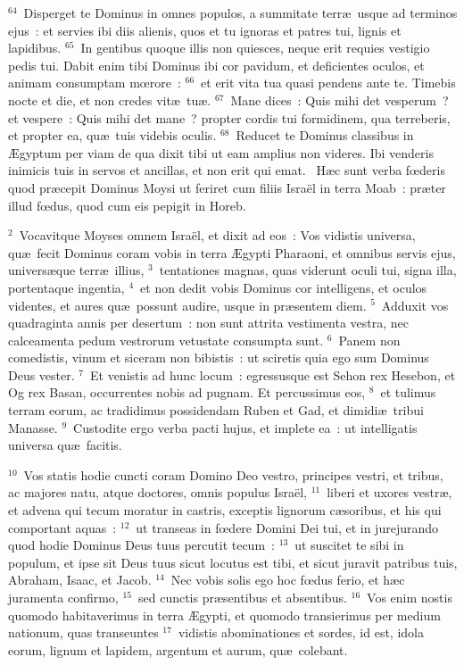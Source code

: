 ${}^{64}$~Disperget te Dominus in omnes populos, a summitate terr\ae\ usque ad terminos ejus~: et servies ibi diis alienis, quos et tu ignoras et patres tui, lignis et lapidibus.
${}^{65}$~In gentibus quoque illis non quiesces, neque erit requies vestigio pedis tui. Dabit enim tibi Dominus ibi cor pavidum, et deficientes oculos, et animam consumptam mœrore~:
${}^{66}$~et erit vita tua quasi pendens ante te. Timebis nocte et die, et non credes vit\ae\ tu\ae .
${}^{67}$~Mane dices~: Quis mihi det vesperum~? et vespere~: Quis mihi det mane~? propter cordis tui formidinem, qua terreberis, et propter ea, qu\ae\ tuis videbis oculis.
${}^{68}$~Reducet te Dominus classibus in \AE gyptum per viam de qua dixit tibi ut eam amplius non videres. Ibi venderis inimicis tuis in servos et ancillas, et non erit qui emat.
~\lettrine[lines=10,image=true,loversize=0.05,lraise=-0.03]{H}{}\ae c sunt verba fœderis quod pr\ae cepit Dominus Moysi ut feriret cum filiis Isra\"el in terra Moab~: pr\ae ter illud fœdus, quod cum eis pepigit in Horeb.


${}^{2}$~Vocavitque Moyses omnem Isra\"el, et dixit ad eos~: Vos vidistis universa, qu\ae\ fecit Dominus coram vobis in terra \AE gypti Pharaoni, et omnibus servis ejus, univers\ae que terr\ae\ illius,
${}^{3}$~tentationes magnas, quas viderunt oculi tui, signa illa, portentaque ingentia,
${}^{4}$~et non dedit vobis Dominus cor intelligens, et oculos videntes, et aures qu\ae\ possunt audire, usque in pr\ae sentem diem.
${}^{5}$~Adduxit vos quadraginta annis per desertum~: non sunt attrita vestimenta vestra, nec calceamenta pedum vestrorum vetustate consumpta sunt.
${}^{6}$~Panem non comedistis, vinum et siceram non bibistis~: ut sciretis quia ego sum Dominus Deus vester.
${}^{7}$~Et venistis ad hunc locum~: egressusque est Sehon rex Hesebon, et Og rex Basan, occurrentes nobis ad pugnam. Et percussimus eos,
${}^{8}$~et tulimus terram eorum, ac tradidimus possidendam Ruben et Gad, et dimidi\ae\ tribui Manasse.
${}^{9}$~Custodite ergo verba pacti hujus, et implete ea~: ut intelligatis universa qu\ae\ facitis.


${}^{10}$~Vos statis hodie cuncti coram Domino Deo vestro, principes vestri, et tribus, ac majores natu, atque doctores, omnis populus Isra\"el,
${}^{11}$~liberi et uxores vestr\ae , et advena qui tecum moratur in castris, exceptis lignorum c\ae soribus, et his qui comportant aquas~:
${}^{12}$~ut transeas in fœdere Domini Dei tui, et in jurejurando quod hodie Dominus Deus tuus percutit tecum~:
${}^{13}$~ut suscitet te sibi in populum, et ipse sit Deus tuus sicut locutus est tibi, et sicut juravit patribus tuis, Abraham, Isaac, et Jacob.
${}^{14}$~Nec vobis solis ego hoc fœdus ferio, et h\ae c juramenta confirmo,
${}^{15}$~sed cunctis pr\ae sentibus et absentibus.
${}^{16}$~Vos enim nostis quomodo habitaverimus in terra \AE gypti, et quomodo transierimus per medium nationum, quas transeuntes
${}^{17}$~vidistis abominationes et sordes, id est, idola eorum, lignum et lapidem, argentum et aurum, qu\ae\ colebant.


